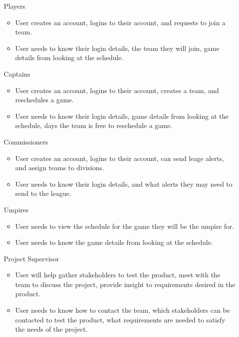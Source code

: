 \documentclass[12pt]{article}
\begin{document}
\begin{itemize}
  \item [Players]
  \begin{itemize}
    \item User creates an account, logins to their account,
    and requests to join a team.
    \item User needs to know their login details, the team they
    will join, game details from looking at the schedule.
  \end{itemize}
  \item [Captains]
  \begin{itemize}
    \item User creates an account, logins to their account,
    creates a team, and reschedules a game.
    \item User needs to know their login details, game details from
    looking at the schedule, days the team is free to reschedule a game.
  \end{itemize}
  \item [Commissioners]
  \begin{itemize}
    \item User creates an account, logins to their account,
    can send leage alerts, and assign teams to divisions.
    \item User needs to know their login details, and what alerts
    they may need to send to the league.
  \end{itemize}
  \item [Umpires]
  \begin{itemize}
    \item User needs to view the schedule for the game they will
    be the umpire for.
    \item User needs to know the game details from looking at the
    schedule.
  \end{itemize}
  \item [Project Supervisor]
  \begin{itemize}
    \item User will help gather stakeholders to test the product,
    meet with the team to discuss the project, provide insight
    to requirements desired in the product.
    \item User needs to know how to contact the team, which stakeholders
    can be contacted to test the product, what requirements are needed
    to satisfy the needs of the project.
  \end{itemize}
\end{itemize}
\end{document}
